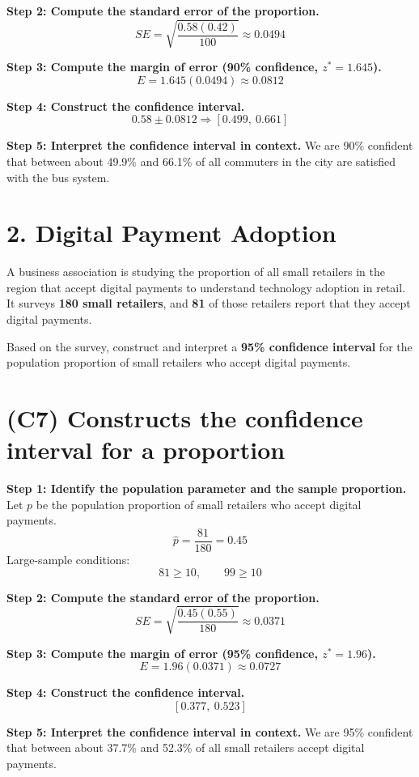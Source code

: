 	\textbf{Step 2: Compute the standard error of the proportion.}
	\[
	SE = \sqrt{\frac{0.58(0.42)}{100}} \approx 0.0494
	\]
	
	\textbf{Step 3: Compute the margin of error (90\% confidence, \(z^* = 1.645\)).}
	\[
	E = 1.645(0.0494) \approx 0.0812
	\]
	
	\textbf{Step 4: Construct the confidence interval.}
	\[
	0.58 \pm 0.0812 \Rightarrow [0.499,\ 0.661]
	\]
	
	\textbf{Step 5: Interpret the confidence interval in context.}
	We are 90\% confident that between about 49.9\% and 66.1\% of all commuters in the city are satisfied with the bus system.
	
\section*{2. Digital Payment Adoption}

A business association is studying the proportion of all small retailers in the region that accept digital payments to understand technology adoption in retail. It surveys \textbf{180 small retailers}, and \textbf{81} of those retailers report that they accept digital payments.

Based on the survey, construct and interpret a \textbf{95\% confidence interval} for the population proportion of small retailers who accept digital payments.
	
	\section{(C7) Constructs the confidence interval for a proportion}
	
	\textbf{Step 1: Identify the population parameter and the sample proportion.}
	Let \(p\) be the population proportion of small retailers who accept digital payments.
	\[
	\hat{p} = \frac{81}{180} = 0.45
	\]
	Large-sample conditions:
	\[
	81 \ge 10, \qquad 99 \ge 10
	\]
	
	\textbf{Step 2: Compute the standard error of the proportion.}
	\[
	SE = \sqrt{\frac{0.45(0.55)}{180}} \approx 0.0371
	\]
	
	\textbf{Step 3: Compute the margin of error (95\% confidence, \(z^* = 1.96\)).}
	\[
	E = 1.96(0.0371) \approx 0.0727
	\]
	
	\textbf{Step 4: Construct the confidence interval.}
	\[
	[0.377,\ 0.523]
	\]
	
	\textbf{Step 5: Interpret the confidence interval in context.}
	We are 95\% confident that between about 37.7\% and 52.3\% of all small retailers accept digital payments.
	
